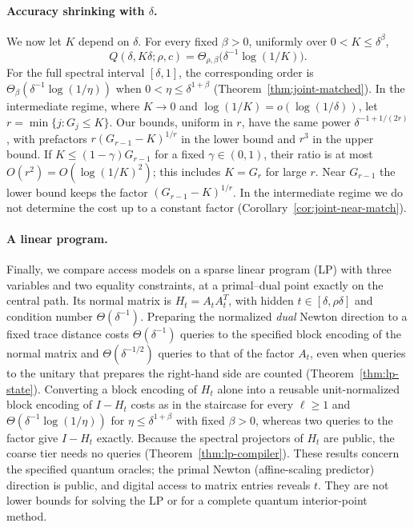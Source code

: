 \paragraph{Accuracy shrinking with $\delta$.}
We now let $K$ depend on $\delta$. For every fixed $\beta>0$, uniformly over $0<K\leq\delta^\beta$,
\[
 Q(\delta,K\delta;\rho,c)
 =\Theta_{\rho,\beta}\bigl(\delta^{-1}\log(1/K)\bigr).
\]
For the full spectral interval $[\delta,1]$, the corresponding order is
$\Theta_\beta(\delta^{-1}\log(1/\eta))$ when $0<\eta\leq\delta^{1+\beta}$ (Theorem~\ref{thm:joint-matched}). In the intermediate regime, where $K\to0$ and $\log(1/K)=o(\log(1/\delta))$, let $r=\min\{j:G_j\leq K\}$. Our bounds, uniform in $r$, have the same power $\delta^{-1+1/(2r)}$, with prefactors $r(G_{r-1}-K)^{1/r}$ in the lower bound and $r^3$ in the upper bound. If $K\leq(1-\gamma)G_{r-1}$ for a fixed $\gamma\in(0,1)$, their ratio is at most $O(r^2)=O(\log(1/K)^2)$; this includes $K=G_r$ for large $r$. Near $G_{r-1}$ the lower bound keeps the factor $(G_{r-1}-K)^{1/r}$. In the intermediate regime we do not determine the cost up to a constant factor (Corollary~\ref{cor:joint-near-match}).

\paragraph{A linear program.}
Finally, we compare access models on a sparse linear program (LP) with three variables and two equality constraints, at a primal--dual point exactly on the central path. Its normal matrix is $H_t=A_tA_t^T$, with hidden $t\in[\delta,\rho\delta]$ and condition number $\Theta(\delta^{-1})$. Preparing the normalized \emph{dual} Newton direction to a fixed trace distance costs $\Theta(\delta^{-1})$ queries to the specified block encoding of the normal matrix and $\Theta(\delta^{-1/2})$ queries to that of the factor $A_t$, even when queries to the unitary that prepares the right-hand side are counted (Theorem~\ref{thm:lp-state}). Converting a block encoding of $H_t$ alone into a reusable unit-normalized block encoding of $I-H_t$ costs as in the staircase for every $\ell\geq1$ and $\Theta(\delta^{-1}\log(1/\eta))$ for $\eta\leq\delta^{1+\beta}$ with fixed $\beta>0$, whereas two queries to the factor give $I-H_t$ exactly. Because the spectral projectors of $H_t$ are public, the coarse tier needs no queries (Theorem~\ref{thm:lp-compiler}). These results concern the specified quantum oracles; the primal Newton (affine-scaling predictor) direction is public, and digital access to matrix entries reveals $t$. They are not lower bounds for solving the LP or for a complete quantum interior-point method.

